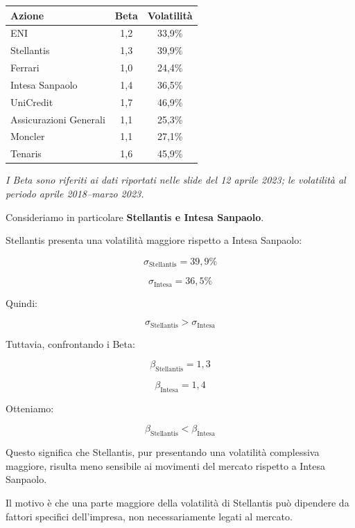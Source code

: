 \begin{center}
\begin{tabular}{|l|c|c|}
\hline
\textbf{Azione} &
\textbf{Beta} &
\textbf{Volatilità} \\
\hline
ENI & 1,2 & 33,9\% \\
\hline
Stellantis & 1,3 & 39,9\% \\
\hline
Ferrari & 1,0 & 24,4\% \\
\hline
Intesa Sanpaolo & 1,4 & 36,5\% \\
\hline
UniCredit & 1,7 & 46,9\% \\
\hline
Assicurazioni Generali & 1,1 & 25,3\% \\
\hline
Moncler & 1,1 & 27,1\% \\
\hline
Tenaris & 1,6 & 45,9\% \\
\hline
\end{tabular}
\end{center}

\noindent \textit{I Beta sono riferiti ai dati riportati
nelle slide del 12 aprile 2023; le volatilità
al periodo aprile 2018--marzo 2023.}

\medskip

\noindent Consideriamo in particolare
\textbf{Stellantis e Intesa Sanpaolo}.

\medskip

\noindent Stellantis presenta una volatilità
maggiore rispetto a Intesa Sanpaolo:

\[
\sigma_{\text{Stellantis}}=39{,}9\%
\]

\[
\sigma_{\text{Intesa}}=36{,}5\%
\]

\noindent Quindi:

\[
\boxed{
\sigma_{\text{Stellantis}}>
\sigma_{\text{Intesa}}
}
\]

\noindent Tuttavia, confrontando i Beta:

\[
\beta_{\text{Stellantis}}=1{,}3
\]

\[
\beta_{\text{Intesa}}=1{,}4
\]

\noindent Otteniamo:

\[
\boxed{
\beta_{\text{Stellantis}}<
\beta_{\text{Intesa}}
}
\]

\noindent Questo significa che Stellantis,
pur presentando una volatilità complessiva maggiore,
risulta meno sensibile ai movimenti del mercato
rispetto a Intesa Sanpaolo.

\medskip

\noindent Il motivo è che una parte maggiore
della volatilità di Stellantis può dipendere
da fattori specifici dell'impresa,
non necessariamente legati al mercato.

